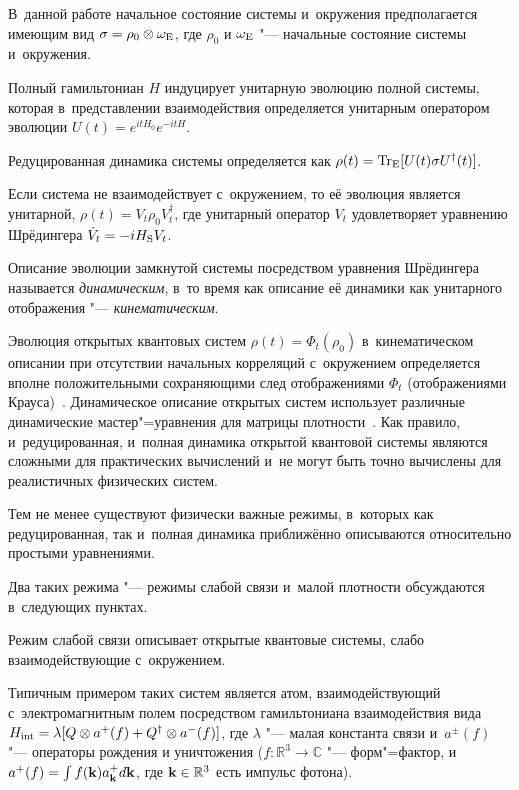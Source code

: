 В~данной работе начальное состояние системы и~окружения предполагается имеющим вид $\sigma=\rho_0\otimes\omega_{\rm E}$, где $\rho_0$ и $\omega_{\rm E}$ "--- начальные состояние системы и~окружения. 

Полный гамильтониан $H$ индуцирует унитарную эволюцию полной системы, которая в~представлении взаимодействия определяется унитарным оператором эволюции $U(t)=e^{itH_0}e^{-itH}$. 

Редуцированная динамика системы определяется как  $\rho(t)={\rm Tr}_{\rm E}[U(t)\sigma U^\dagger(t)]$.



Если система не взаимодействует с~окружением, то её эволюция является унитарной, $\rho(t)=V_t\rho_0 V_t^\dagger$, где унитарный оператор $V_t$ удовлетворяет уравнению Шрёдингера $\dot V_t=-iH_{\rm S}V_t$. 

Описание эволюции замкнутой системы посредством уравнения Шрёдингера называется {\it динамическим}, в~то время как описание её динамики как унитарного отображения "--- {\it кинематическим}. 

Эволюция открытых квантовых систем $\rho(t)=\Phi_t(\rho_0)$ в~кинематическом описании при отсутствии начальных корреляций с~окружением определяется вполне положительными сохраняющими след отображениями $\Phi_t$ (отображениями Крауса)~\cite{Kraus}. Динамическое описание открытых систем использует различные динамические мастер"=уравнения для матрицы плотности~\cite{Breuer}. Как правило, и~редуцированная, и~полная динамика открытой квантовой системы являются сложными для практических вычислений и~не могут быть точно вычислены для реалистичных физических систем. 

Тем не менее существуют физически важные режимы, в~которых как редуцированная, так и~полная динамика приближённо описываются относительно простыми уравнениями. 

Два таких режима "--- режимы слабой связи и~малой плотности обсуждаются в~следующих пунктах.



\smallskip \hypertarget{Sec:WCL}{}


Режим слабой связи описывает открытые квантовые системы, слабо взаимодействующие с~окружением. 

Типичным примером таких систем является атом, взаимодействующий с~электромагнитным полем посредством гамильтониана взаимодействия вида $H_{\rm int}=\lambda [Q\otimes a^{+}(f)+Q^\dagger\otimes a^{-}(f)]$, где $\lambda$ "--- малая константа связи и~$a^\pm(f)$ "--- операторы рождения и уничтожения ($f:\mathbb R^3\to\mathbb C$ "--- форм"=фактор, и~$a^{+}(f)=\int f({\bf k})a_{{\bf k}}^{+} d{\bf k}$, где ${\bf k}\in\mathbb R^3$ есть импульс фотона). 

